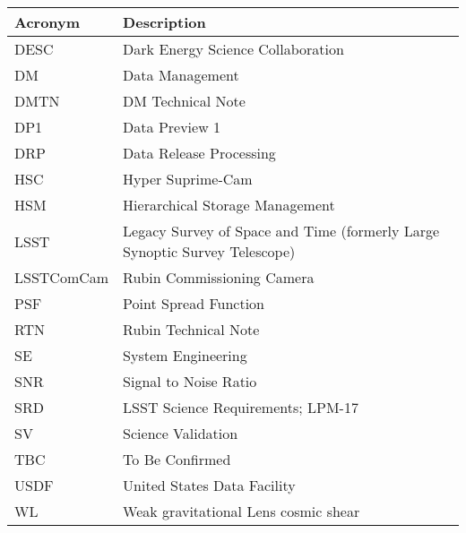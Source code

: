 \addtocounter{table}{-1}
\begin{longtable}{p{}p{}}\hline
\textbf{Acronym} & \textbf{Description}  \\\hline

DESC & Dark Energy Science Collaboration \\\hline
DM & Data Management \\\hline
DMTN & DM Technical Note \\\hline
DP1 & Data Preview 1 \\\hline
DRP & Data Release Processing \\\hline
HSC & Hyper Suprime-Cam \\\hline
HSM & Hierarchical Storage Management \\\hline
LSST & Legacy Survey of Space and Time (formerly Large Synoptic Survey Telescope) \\\hline
LSSTComCam & Rubin Commissioning Camera \\\hline
PSF & Point Spread Function \\\hline
RTN & Rubin Technical Note \\\hline
SE & System Engineering \\\hline
SNR & Signal to Noise Ratio \\\hline
SRD & LSST Science Requirements; LPM-17 \\\hline
SV & Science Validation \\\hline
TBC & To Be Confirmed \\\hline
USDF & United States Data Facility \\\hline
WL & Weak gravitational Lens cosmic shear \\\hline
\end{longtable}
